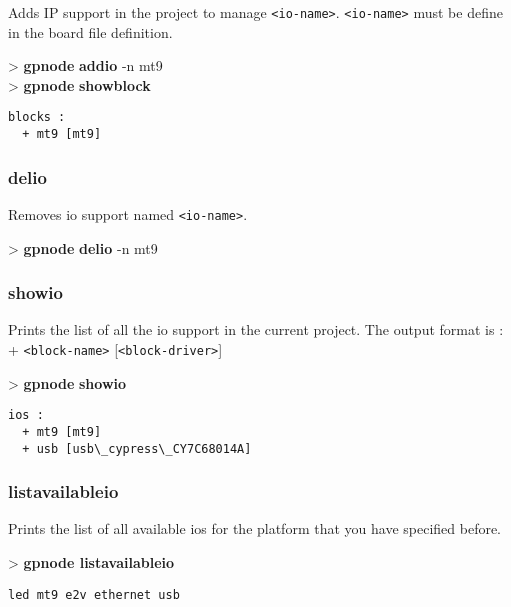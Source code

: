 \documentclass[10pt,a4paper]{article}
\begin{document}
Adds IP support in the project to manage \texttt{<io-name>}. \texttt{<io-name>} must be define in the board file definition.

\begin{sampletitle}
> \textbf{gpnode} \textbf{addio} -n mt9\\
> \textbf{gpnode} \textbf{showblock}
\begin{Verbatim}
blocks :
  + mt9 [mt9]
\end{Verbatim}
\end{sampletitle}

\subsubsection{delio}

Removes io support named \texttt{<io-name>}.

\begin{sampletitle}
> \textbf{gpnode} \textbf{delio} -n mt9
\end{sampletitle}

\subsubsection{showio}

Prints the list of all the io support in the current project. The output format is : + \texttt{<block-name>} [\texttt{<block-driver>}]

\begin{sampletitle}
> \textbf{gpnode} \textbf{showio}
\begin{Verbatim}
ios :
  + mt9 [mt9]
  + usb [usb\_cypress\_CY7C68014A]
\end{Verbatim}
\end{sampletitle}

\subsubsection{listavailableio}

Prints the list of all available ios for the platform that you have specified before.

\begin{sampletitle}
> \textbf{gpnode listavailableio}
\begin{Verbatim}
led mt9 e2v ethernet usb
\end{Verbatim}
\end{sampletitle}
\end{document}
